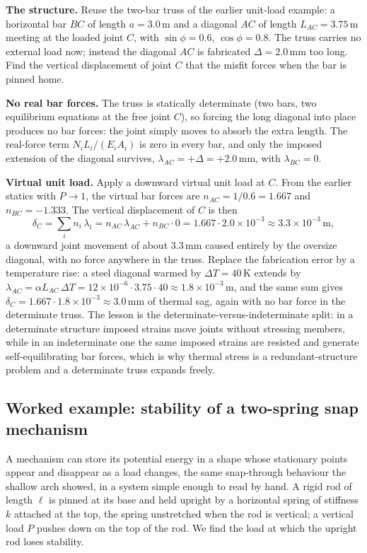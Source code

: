 \textbf{The structure.} Reuse the two-bar truss of the earlier unit-load
example: a horizontal bar $BC$ of length $a = 3.0\,\si{\meter}$ and a
diagonal $AC$ of length $L_{AC} = 3.75\,\si{\meter}$ meeting at the loaded
joint $C$, with $\sin\phi = 0.6$, $\cos\phi = 0.8$. The truss carries no
external load now; instead the diagonal $AC$ is fabricated $\Delta =
2.0\,\si{\milli\meter}$ too long. Find the vertical displacement of joint
$C$ that the misfit forces when the bar is pinned home.

\textbf{No real bar forces.} The truss is statically determinate (two bars,
two equilibrium equations at the free joint $C$), so forcing the long
diagonal into place produces no bar forces: the joint simply moves to
absorb the extra length. The real-force term $N_i L_i/(E_i A_i)$ is zero in
every bar, and only the imposed extension of the diagonal survives,
$\lambda_{AC} = +\Delta = +2.0\,\si{\milli\meter}$, with $\lambda_{BC} = 0$.

\textbf{Virtual unit load.} Apply a downward virtual unit load at $C$. From
the earlier statics with $P\to 1$, the virtual bar forces are $n_{AC} =
1/0.6 = 1.667$ and $n_{BC} = -1.333$. The vertical displacement of $C$ is
then
\[
\delta_C = \sum_i n_i\,\lambda_i
= n_{AC}\,\lambda_{AC} + n_{BC}\cdot 0
= 1.667 \cdot 2.0\times 10^{-3}
\approx 3.3\times 10^{-3}\,\si{\meter},
\]
a downward joint movement of about $3.3\,\si{\milli\meter}$ caused entirely
by the oversize diagonal, with no force anywhere in the truss. Replace the
fabrication error by a temperature rise: a steel diagonal warmed by $\Delta
T = 40\,\si{\kelvin}$ extends by $\lambda_{AC} = \alpha L_{AC}\,\Delta T =
12\times 10^{-6}\cdot 3.75\cdot 40 \approx 1.8\times 10^{-3}\,\si{\meter}$,
and the same sum gives $\delta_C = 1.667\cdot 1.8\times 10^{-3} \approx
3.0\,\si{\milli\meter}$ of thermal sag, again with no bar force in the
determinate truss. The lesson is the determinate-versus-indeterminate
split: in a determinate structure imposed strains move joints without
stressing members, while in an indeterminate one the same imposed strains
are resisted and generate self-equilibrating bar forces, which is why
thermal stress is a redundant-structure problem and a determinate truss
expands freely.

\subsection{Worked example: stability of a two-spring snap mechanism}

A mechanism can store its potential energy in a shape whose stationary
points appear and disappear as a load changes, the same snap-through
behaviour the shallow arch showed, in a system simple enough to read by
hand. A rigid rod of length $\ell$ is pinned at its base and held upright by
a horizontal spring of stiffness $k$ attached at the top, the spring
unstretched when the rod is vertical; a vertical load $P$ pushes down on the
top of the rod. We find the load at which the upright rod loses stability.

